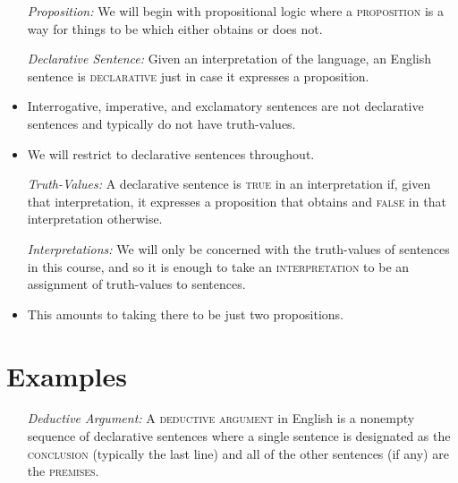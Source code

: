 \documentclass[a4paper, 11pt]{article} %
\begin{document}
\begin{itemize}[leftmargin=1in,labelsep=.15in]
  \item[\it Proposition:] We will begin with propositional logic where a \textsc{proposition} is a way for things to be which either obtains or does not.
  \item[\it Declarative Sentence:] Given an interpretation of the language, an English sentence is \textsc{declarative} just in case it expresses a proposition.
    \item Interrogative, imperative, and exclamatory sentences are not declarative sentences and typically do not have truth-values. 
    \item We will restrict to declarative sentences throughout.
  \item[\it Truth-Values:] A declarative sentence is \textsc{true} in an interpretation if, given that interpretation, it expresses a proposition that obtains and \textsc{false} in that interpretation otherwise.
  \item[\it Interpretations:] We will only be concerned with the truth-values of sentences in this course, and so it is enough to take an \textsc{interpretation} to be an assignment of truth-values to sentences.
    \item This amounts to taking there to be just two propositions. %
\end{itemize}




\section*{Examples}

\begin{itemize}[leftmargin=1in,labelsep=.15in]
  \item[\it Deductive Argument:] A \textsc{deductive argument} in English is a nonempty sequence of declarative sentences where a single sentence is designated as the \textsc{conclusion} (typically the last line) and all of the other sentences (if any) are the \textsc{premises}.
\end{itemize}
\end{document}

